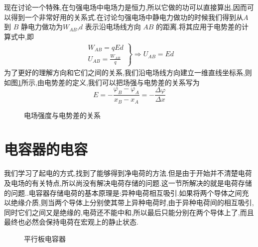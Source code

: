   现在讨论一个特殊,在匀强电场中电场力是恒力,所以它做的功可以直接算出,因而可以得到一个非常好用的关系式.在讨论匀强电场中静电力做功的时候我们得到从$A$ 到 $B$ 静电力做功为$W_{AB}$,$d$ 表示沿电场线方向 $AB$ 的距离.将其应用于电势差的计算式中,即
  \begin{gather}
    \left.
      \begin{gathered}
	W_{AB}=qEd \\
	U_{AB}=\frac{W_{AB}}{q}
      \end{gathered}
    \right\}
    \Longrightarrow
    U_{AB}=Ed
    \label{eq:EanU}
  \end{gather}
  为了更好的理解方向和它们之间的关系,我们沿电场线方向建立一维直线坐标系,则如图\ref{fig:PhiAndE}所示,由电势差的定义,我们可以把场强与电势差的关系写为
  \begin{equation}
    E=-\frac{\varphi_B-\varphi_A}{x_B-x_A}=-\frac{\Delta\varphi}{\Delta x}
    \label{eq:EandU1}
  \end{equation}
\begin{figure}[H]
  \centering
  \caption{电场强度与电势差的关系}
  \label{fig:PhiAndE}
\end{figure}

\section{电容器的电容}

我们学习了起电的方式,找到了能够得到净电荷的方法.但是由于开始并不清楚电荷及电场的有关特点,所以尚没有解决电荷存储的问题.这一节所解决的就是电荷存储的问题..电容器存储电荷的基本原理是:异种电荷相互吸引.如果将两个导体之间充以绝缘介质,则当两个导体上分别使其带上异种电荷时,由于异种电荷间的相互吸引,同时它们之间又是绝缘的,电荷还不能中和,所以最后只能分别在两个导体上了,而且最终也必然会保持电荷在宏观上的静止状态.
\begin{figure}[H]
  \centering
  \caption{平行板电容器}
  \label{fig:pingyxingban}
\end{figure}

